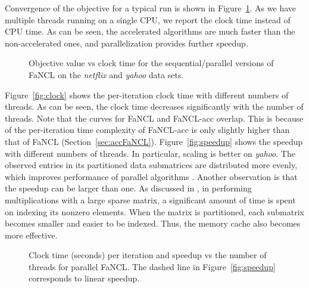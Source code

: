 \documentclass[10pt,journal,compsoc]{IEEEtran}
\begin{document}
Convergence of the objective
for a typical 
run is shown in Figure~\ref{fig:plobj}.
As we have multiple threads running on a single CPU, we report the
clock time instead of CPU time.
As can be seen, the accelerated algorithms are much faster than the non-accelerated ones,
and parallelization provides further speedup.

\begin{figure}[ht]
\centering

\vspace{-10px}
\caption{Objective value vs clock time for the sequential/parallel versions of \textsf{FaNCL} 
on the \textit{netflix} and \textit{yahoo} data sets.}
\label{fig:plobj}
\vspace{-5px}
\end{figure}

Figure~\ref{fig:clock} shows the 
per-iteration 
clock time 
with different numbers of threads.
As can be seen, the clock time decreases significantly with the number of threads.
Note that the curves for \textsf{FaNCL} and \textsf{FaNCL-acc} overlap.
This is because of the per-iteration time complexity of \textsf{FaNCL-acc} 
is only slightly higher than that of \textsf{FaNCL} (Section~\ref{sec:accFaNCL}).
Figure~\ref{fig:speedup} shows the speedup with different numbers of threads.
In particular, scaling is
better on \textit{yahoo}.
The observed entries in its partitioned data submatrices 
are distributed more evenly, 
which improves performance of parallel algorithms
\cite{gemulla2011large}.
Another observation  is that the speedup can be larger
than one.  As discussed in \cite{bertsekas1997parallel}, in performing multiplications
with a large sparse matrix, a significant amount of time is spent on indexing its nonzero
elements.  When the matrix is partitioned, each submatrix becomes smaller and easier to be  indexed.
Thus, the memory cache also becomes more effective.

\begin{figure}[ht]
\centering
{}

\vspace{-10px}
\caption{Clock time (seconds) per iteration and speedup
 vs the number of threads for parallel \textsf{FaNCL}.  
The dashed line in 
Figure~\ref{fig:speedup}
corresponds to linear speedup.}
\label{fig:paraspeedup}
\end{figure}
\end{document}
